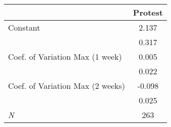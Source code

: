 \setlength{\tabcolsep}{1em} %
\def\arraystretch{1.3}

\renewcommand\thetable{A2} 
\begin{tabular}{lc}
\toprule
                                 &     Protest     \\
\hline                                 
Constant                      & 2.137\sym{***} \\
                                 & 0.317    \\
Coef. of Variation Max (1 week) & 0.005   \\
                                 & 0.022  \\
Coef. of Variation Max (2 weeks) & -0.098\sym{***}  \\
                                 & 0.025  \\
\midrule
\textit{N} & 263 \\
\bottomrule
\end{tabular}